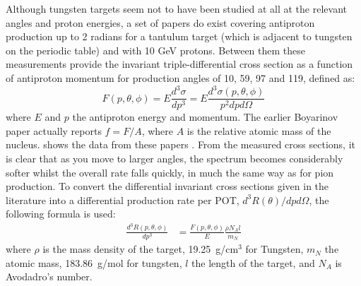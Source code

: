 Although tungsten targets seem not to have been studied at all at the relevant angles and proton energies, a set of papers \cite{Boyarinov:1994tp,Kiselev:2012sj} do exist covering antiproton production up to 2 radians for a tantulum target (which is adjacent to tungsten on the periodic table) and with 10 GeV protons.
Between them these measurements provide the invariant triple-differential cross section as a function of antiproton momentum for production angles of 10, 59, 97 and 119\degree, defined as:
\begin{equation}
	F(p,\theta,\phi)=E \frac{d^3\sigma}{dp^3}=E\frac{d^3\sigma(p,\theta,\phi)}{p^2dpd\Omega}
\end{equation}
where $E$ and $p$ the antiproton energy and momentum.  The earlier Boyarinov paper actually reports $f=F/A$, where $A$ is the relative atomic mass of the nucleus.
 shows the data from these papers .
From the measured cross sections, it is clear that as you move to larger angles, the spectrum becomes considerably softer whilst the overall rate falls quickly, in much the same way as for pion production.
To convert the differential invariant cross sections given in the literature into a differential production rate per \ac{POT}, $d^3R(\theta)/dpd\Omega$, the following formula is used:
\begin{align}
	\frac{d^3R(p,\theta,\phi)}{dp^3}&=\frac{F(p,\theta,\phi)}{E}\frac{\rho N_A l}{m_N}
\end{align}
where $\rho$ is the mass density of the target, 19.25~g/cm$^3$ for Tungsten, $m_N$ the atomic mass, 183.86~g/mol for tungsten, $l$ the length of the target, and $N_A$ is Avodadro's number.

